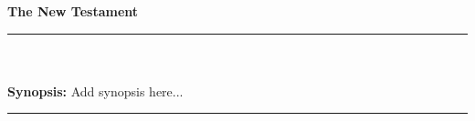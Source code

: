 \newpage
\thispagestyle{empty}

\begin{center}
\vspace{5cm}
\Huge \textbf{The New Testament}
\end{center}

\rule{\textwidth}{0.5pt}\\  %
\vspace{-.4em} \\
\small \textbf{Synopsis:} Add synopsis here... \\
\rule{\textwidth}{0.5pt}    %